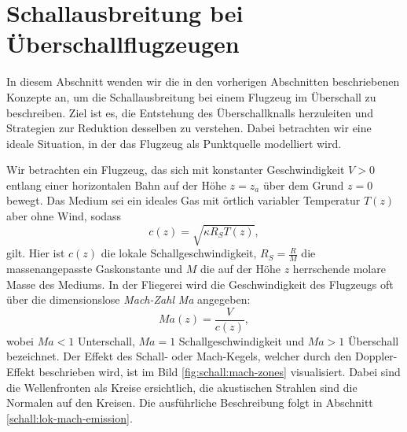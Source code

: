 %
%
%
%
\section{Schallausbreitung bei Überschallflugzeugen
\label{schall:section:teil3}}
%

In diesem Abschnitt wenden wir die in den vorherigen Abschnitten
beschriebenen Konzepte an, um die Schallausbreitung bei einem
Flugzeug im Überschall zu beschreiben.
Ziel ist es, die Entstehung des Überschallknalls herzuleiten und Strategien
%
zur Reduktion desselben zu verstehen.
Dabei betrachten wir eine ideale Situation, in der das Flugzeug als
Punktquelle modelliert wird.

Wir betrachten ein Flugzeug, das sich mit konstanter Geschwindigkeit
$V>0$ entlang einer horizontalen Bahn auf der Höhe $z=z_a$ über
dem Grund $z=0$ bewegt.
Das Medium sei ein ideales Gas mit örtlich variabler Temperatur
$T(z)$ aber ohne Wind, sodass
\begin{equation}
    c(z) = \sqrt{\kappa R_ST(z)} ,
    \label{eq:c-of-z}
\end{equation}
gilt. Hier ist $c(z)$ die lokale Schallgeschwindigkeit, $R_S = \frac{R}{M}$
die massenangepasste Gaskonstante und $M$ die auf der Höhe $z$ herrschende
molare Masse des Mediums.
In der Fliegerei wird die Geschwindigkeit des Flugzeugs oft über die
dimensionslose \emph{Mach-Zahl} \textit{Ma} angegeben:
%
\begin{equation}
    \textit{Ma}(z) = \frac{V}{c(z)},
    \label{eq:mach-number}
\end{equation}
wobei $\textit{Ma}<1$ Unterschall, $\textit{Ma}=1$ Schallgeschwindigkeit
und $\textit{Ma}>1$ Überschall bezeichnet.
Der Effekt des Schall- oder Mach-Kegels, welcher durch den Doppler-Effekt
beschrieben wird, ist im Bild \ref{fig:schall:mach-zones} visualisiert.
Dabei sind die Wellenfronten als Kreise ersichtlich, die akustischen
Strahlen sind die Normalen auf den Kreisen. Die ausführliche Beschreibung
folgt in Abschnitt \ref{schall:lok-mach-emission}.

